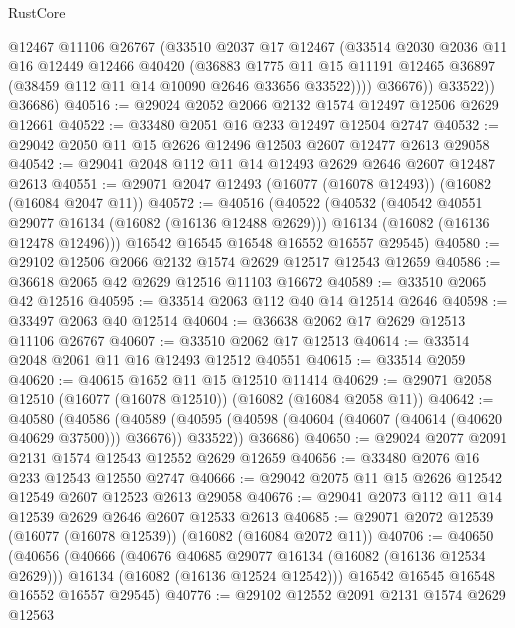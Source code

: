 \begin{lexlean}{RustCore}
\begin{coremodule}
              @12467
              @11106
              @26767
              (@33510
                @2037
                @17
                @12467
                (@33514
                  @2030
                  @2036
                  @11
                  @16
                  @12449
                  @12466
                  @40420
                  (@36883
                    @1775
                    @11
                    @15
                    @11191
                    @12465
                    @36897
                    (@38459 @112 @11 @14 @10090 @2646 @33656 @33522))))
              @36676))
          @33522))
      @36686)
@40516 := @29024 @2052 @2066 @2132 @1574 @12497 @12506 @2629 @12661
@40522 := @33480 @2051 @16 @233 @12497 @12504 @2747
@40532 := @29042 @2050 @11 @15 @2626 @12496 @12503 @2607 @12477 @2613 @29058
@40542 := @29041 @2048 @112 @11 @14 @12493 @2629 @2646 @2607 @12487 @2613
@40551 := @29071 @2047 @12493 (@16077 (@16078 @12493)) (@16082 (@16084 @2047 @11))
@40572 := @40516
    (@40522
      (@40532
        (@40542 @40551 @29077 @16134 (@16082 (@16136 @12488 @2629)))
        @16134
        (@16082 (@16136 @12478 @12496)))
      @16542
      @16545
      @16548
      @16552
      @16557
      @29545)
@40580 := @29102 @12506 @2066 @2132 @1574 @2629 @12517 @12543 @12659
@40586 := @36618 @2065 @42 @2629 @12516 @11103 @16672
@40589 := @33510 @2065 @42 @12516
@40595 := @33514 @2063 @112 @40 @14 @12514 @2646
@40598 := @33497 @2063 @40 @12514
@40604 := @36638 @2062 @17 @2629 @12513 @11106 @26767
@40607 := @33510 @2062 @17 @12513
@40614 := @33514 @2048 @2061 @11 @16 @12493 @12512 @40551
@40615 := @33514 @2059
@40620 := @40615 @1652 @11 @15 @12510 @11414
@40629 := @29071 @2058 @12510 (@16077 (@16078 @12510)) (@16082 (@16084 @2058 @11))
@40642 := @40580
    (@40586
      (@40589 (@40595 (@40598 (@40604 (@40607 (@40614 (@40620 @40629 @37500))) @36676)) @33522))
      @36686)
@40650 := @29024 @2077 @2091 @2131 @1574 @12543 @12552 @2629 @12659
@40656 := @33480 @2076 @16 @233 @12543 @12550 @2747
@40666 := @29042 @2075 @11 @15 @2626 @12542 @12549 @2607 @12523 @2613 @29058
@40676 := @29041 @2073 @112 @11 @14 @12539 @2629 @2646 @2607 @12533 @2613
@40685 := @29071 @2072 @12539 (@16077 (@16078 @12539)) (@16082 (@16084 @2072 @11))
@40706 := @40650
    (@40656
      (@40666
        (@40676 @40685 @29077 @16134 (@16082 (@16136 @12534 @2629)))
        @16134
        (@16082 (@16136 @12524 @12542)))
      @16542
      @16545
      @16548
      @16552
      @16557
      @29545)
@40776 := @29102
    @12552
    @2091
    @2131
    @1574
    @2629
    @12563

\end{coremodule}
\end{lexlean}
